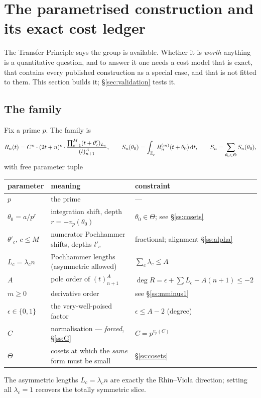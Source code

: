 \section{The parametrised construction and its exact cost ledger}\label{sec:ledger}

The Transfer Principle says the group is available. Whether it is \emph{worth} anything is a
quantitative question, and to answer it one needs a cost model that is exact, that contains
every published construction as a special case, and that is not fitted to them. This section
builds it; \S\ref{sec:validation} tests it.

\subsection{The family}\label{ss:family}

\begin{definition}\label{def:family}
Fix a prime $p$. The family is
\begin{equation}\label{eq:family}
 R_n(t)=C^n\cdot(2t+n)^{\epsilon}\cdot
   \frac{\prod_{c=1}^{M}(t+\theta'_c)_{L_c}}{(t)_{n+1}^{A}},
 \qquad
 S_n(\theta_0)=\int_{\mathbb{Z}_p}R_n^{(m)}(t+\theta_0)\,\mathrm{d} t,
 \qquad
 S_n=\sum_{\theta_0\in\Theta}S_n(\theta_0),
\end{equation}
with free parameter tuple
\begin{center}
\tabsmall
\begin{tabular}{lll}
\toprule
parameter & meaning & constraint\\
\midrule
$p$ & the prime & ---\\
$\theta_0=a/p^r$ & integration shift, depth $r=-v_p(\theta_0)$ & $\theta_0\in\Theta$; see \S\ref{ss:cosets}\\
$\theta'_c$, $c\le M$ & numerator Pochhammer shifts, depths $l'_c$ & fractional; alignment \S\ref{ss:alpha}\\
$L_c=\lambda_cn$ & Pochhammer lengths (asymmetric allowed) & $\sum_c\lambda_c\le A$\\
$A$ & pole order of $(t)_{n+1}^A$ & $\deg R=\epsilon+\sum L_c-A(n+1)\le-2$\\
$m\ge0$ & derivative order & see \S\ref{ss:mminus1}\\
$\epsilon\in\{0,1\}$ & the very-well-poised factor & $\epsilon\le A-2$ (degree)\\
$C$ & normalisation --- \emph{forced}, \S\ref{ss:G} & $C=p^{v_p(C)}$\\
$\Theta$ & cosets at which the \emph{same} form must be small & \S\ref{ss:cosets}\\
\bottomrule
\end{tabular}
\end{center}
The asymmetric lengths $L_c=\lambda_cn$ are exactly the Rhin--Viola direction; setting all
$\lambda_c=1$ recovers the totally symmetric slice.
\end{definition}

